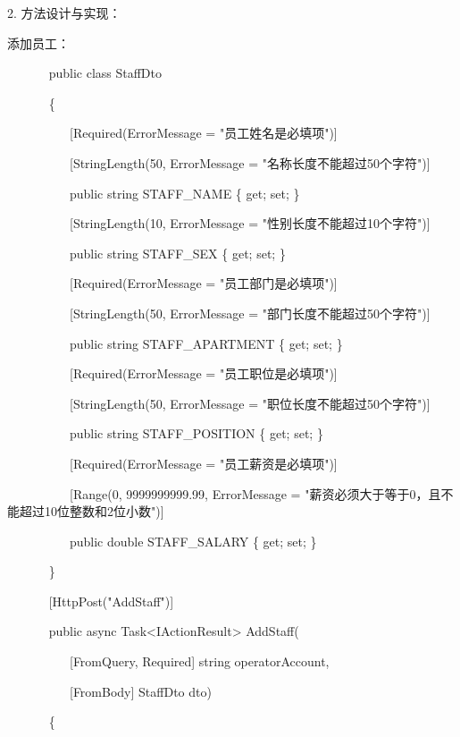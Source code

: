 \documentclass[]{article}
\begin{document}
2. 方法设计与实现：

添加员工：

~ ~ ~ ~ public class StaffDto

~ ~ ~ ~ \{

~ ~ ~ ~ ~ ~ {[}Required(ErrorMessage = "员工姓名是必填项"){]}

~ ~ ~ ~ ~ ~ {[}StringLength(50, ErrorMessage =
"名称长度不能超过50个字符"){]}

~ ~ ~ ~ ~ ~ public string STAFF\_NAME \{ get; set; \}

~ ~ ~ ~ ~ ~ {[}StringLength(10, ErrorMessage =
"性别长度不能超过10个字符"){]}

~ ~ ~ ~ ~ ~ public string STAFF\_SEX \{ get; set; \}

~ ~ ~ ~ ~ ~ {[}Required(ErrorMessage = "员工部门是必填项"){]}

~ ~ ~ ~ ~ ~ {[}StringLength(50, ErrorMessage =
"部门长度不能超过50个字符"){]}

~ ~ ~ ~ ~ ~ public string STAFF\_APARTMENT \{ get; set; \}

~ ~ ~ ~ ~ ~ {[}Required(ErrorMessage = "员工职位是必填项"){]}

~ ~ ~ ~ ~ ~ {[}StringLength(50, ErrorMessage =
"职位长度不能超过50个字符"){]}

~ ~ ~ ~ ~ ~ public string STAFF\_POSITION \{ get; set; \}

~ ~ ~ ~ ~ ~ {[}Required(ErrorMessage = "员工薪资是必填项"){]}

~ ~ ~ ~ ~ ~ {[}Range(0, 9999999999.99, ErrorMessage =
"薪资必须大于等于0，且不能超过10位整数和2位小数"){]}

~ ~ ~ ~ ~ ~ public double STAFF\_SALARY \{ get; set; \}

~ ~ ~ ~ \}

~ ~ ~ ~ {[}HttpPost("AddStaff"){]}

~ ~ ~ ~ public async Task\textless{}IActionResult\textgreater{}
AddStaff(

~ ~ ~ ~ ~ ~ {[}FromQuery, Required{]} string operatorAccount,

~ ~ ~ ~ ~ ~ {[}FromBody{]} StaffDto dto)

~ ~ ~ ~ \{
\end{document}
